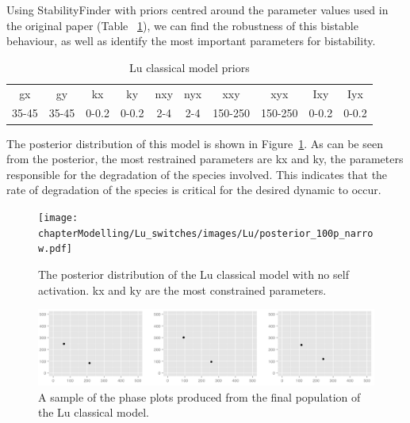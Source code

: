 \clearpage

Using StabilityFinder with priors centred around the parameter values used in the original paper (Table ~\ref{tab:lu}), we can find the robustness of this bistable behaviour, as well as identify the most important parameters for bistability. 
\begin{table}[h]
\centering
\caption{Lu classical model priors}
\label{tab:lu}
\begin{tabular}{cccccccccc}
gx    & gy    & kx    & ky    & nxy & nyx & xxy     & xyx     & Ixy   & Iyx \\
35-45 & 35-45 & 0-0.2 & 0-0.2 & 2-4 & 2-4 & 150-250 & 150-250 & 0-0.2 &   0-0.2 
\end{tabular}
\end{table}

The posterior distribution of this model is shown in Figure~\ref{fig:lu_bistable}. As can be seen from the posterior, the most restrained parameters are kx and ky, the parameters responsible for the degradation of the species involved. This indicates that the rate of degradation of the species is critical for the desired dynamic to occur. 

\begin{figure}[h]
\centering
\texttt{[image: chapterModelling/Lu\_switches/images/Lu/posterior\_100p\_narrow.pdf]}
\caption[The posterior distribution of the Lu classical model with no self activation]{The posterior distribution of the Lu classical model with no self activation. kx and ky are the most constrained parameters.}
\label{fig:lu_bistable}
\end{figure}

\begin{figure}[t]
\centering
\includegraphics[scale=0.2]{chapterModelling/Lu_switches/images/Lu/phase_plot.png}
\caption{A sample of the phase plots produced from the final population of the Lu classical model.}
\label{fig:lu_phase}
\end{figure}

